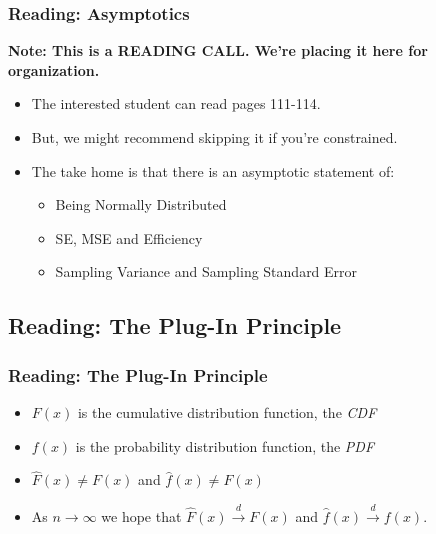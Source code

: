\documentclass[12pt, block=fill]{beamer}
\begin{document}
\begin{frame}
  \frametitle{Reading: Asymptotics}
  \textbf{Note: This is a READING CALL. We're placing it here for
    organization.} 
  \begin{itemize}
  \item The interested student can read pages 111-114.
  \item But, we might recommend skipping it if you're constrained. 
  \item The take home is that there is an asymptotic statement of:
    \begin{itemize}
      \item Being Normally Distributed 
      \item SE, MSE and Efficiency 
      \item Sampling Variance and Sampling Standard Error
      \end{itemize}
    \end{itemize} 
\end{frame}
 

 
\subsection{Reading: The Plug-In Principle}

\begin{frame}
  \frametitle{Reading: The Plug-In Principle}
  \begin{itemize}
    \item $F(x)$ is the cumulative distribution function, the \textit{CDF}
    \item $f(x)$ is the probability distribution function, the \textit{PDF}
    \item $\hat{F}(x) \not= F(x)$ and $\hat{f}(x) \not= F(x)$
     \item As $n\to\infty$ we hope that $\hat{F}(x)
       \overset{d}{\to}F(x)$ and $\hat{f}(x)\overset{d}{\to}f(x)$.
  \end{itemize} 
\end{frame}
\end{document}
